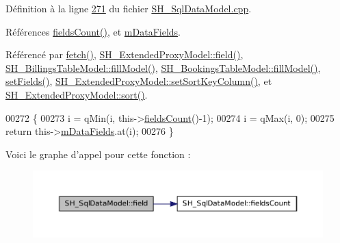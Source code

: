 Définition à la ligne \hyperlink{SH__SqlDataModel_8cpp_source_l00271}{271} du fichier \hyperlink{SH__SqlDataModel_8cpp_source}{S\-H\-\_\-\-Sql\-Data\-Model.\-cpp}.



Références \hyperlink{classSH__SqlDataModel_a0fd7bd5380ce0ba9a2ca84033093432d}{fields\-Count()}, et \hyperlink{classSH__SqlDataModel_a3e998f75dd5b3193783612002461888d}{m\-Data\-Fields}.



Référencé par \hyperlink{classSH__SqlDataModel_a8d9b08d282a304945b9ee2f474020980}{fetch()}, \hyperlink{classSH__ExtendedProxyModel_ac73fae31c6ad69663b4df97f65ec945f}{S\-H\-\_\-\-Extended\-Proxy\-Model\-::field()}, \hyperlink{classSH__BillingsTableModel_a71a4e8482cf80dfca43a009400d7b96e}{S\-H\-\_\-\-Billings\-Table\-Model\-::fill\-Model()}, \hyperlink{classSH__BookingsTableModel_a3531ec1df4b0fb132b706bab80c29995}{S\-H\-\_\-\-Bookings\-Table\-Model\-::fill\-Model()}, \hyperlink{classSH__SqlDataModel_a1a345d536e6e08a03cb333351ce677af}{set\-Fields()}, \hyperlink{classSH__ExtendedProxyModel_ad1eb97a28d23e9aba8174bd5ffd7a5e4}{S\-H\-\_\-\-Extended\-Proxy\-Model\-::set\-Sort\-Key\-Column()}, et \hyperlink{classSH__ExtendedProxyModel_a5ed9b14df78667efe8b22d19617d6c4b}{S\-H\-\_\-\-Extended\-Proxy\-Model\-::sort()}.


\begin{DoxyCode}
00272 \{
00273     i = qMin(i, this->\hyperlink{classSH__SqlDataModel_a0fd7bd5380ce0ba9a2ca84033093432d}{fieldsCount}()-1);
00274     i = qMax(i, 0);
00275     \textcolor{keywordflow}{return} this->\hyperlink{classSH__SqlDataModel_a3e998f75dd5b3193783612002461888d}{mDataFields}.at(i);
00276 \}
\end{DoxyCode}


Voici le graphe d'appel pour cette fonction \-:
\nopagebreak
\begin{figure}[H]
\begin{center}
\leavevmode
\includegraphics[width=350pt]{classSH__SqlDataModel_a442cdea9007cb61ed9d2fbdd01ddccbf_cgraph}
\end{center}
\end{figure}




